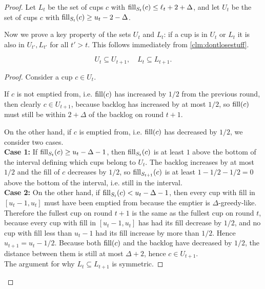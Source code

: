 \begin{proof}
  Let $L_t$ be the set of cups $c$ with $\operatorname{\text{\textup{fill}}}_{S_t}(c) \le \ell_t+2+\Delta$, and let
  $U_t$ be the set of cups $c$ with $\operatorname{\text{\textup{fill}}}_{S_t}(c) \ge u_t-2-\Delta$.

  Now we prove a key property of the sets $U_t$ and $L_t$: if a cup is in
  $U_t$ or $L_t$ it is also in $U_{t'}, L_{t'}$ for all $t' > t$. This
  follows immediately from \cref{clm:dontlosestuff}.
  \begin{clm}
    \label{clm:dontlosestuff}
    $$U_{t} \subseteq U_{t+1},\quad L_t \subseteq L_{t+1}.$$
  \end{clm}
  \begin{proof}
    Consider a cup $c\in U_t$.

    If $c$ is not emptied from, i.e. $\operatorname{\text{\textup{fill}}}(c)$ has increased by
    $1/2$ from the previous round, then
    clearly $c \in U_{t+1}$, because backlog has increased by at most $1/2$, so
    $\operatorname{\text{\textup{fill}}}(c)$ must still be within $2+\Delta$ of the backlog on round $t+1$. 

    On the other hand, if $c$ is emptied from, i.e. $\operatorname{\text{\textup{fill}}}(c)$ has decreased by
    $1/2$, we consider two cases.\\
    \textbf{Case 1:} If $\operatorname{\text{\textup{fill}}}_{S_t}(c) \ge u_t-\Delta -1$, then
    $\operatorname{\text{\textup{fill}}}_{S_t}(c)$ is at least $1$ above the bottom of the
    interval defining which cups belong to $U_t$. The backlog
    increases by at most $1/2$ and the fill of $c$ decreases by $1/2$, so
    $\operatorname{\text{\textup{fill}}}_{S_{t+1}}(c)$ is at least $1-1/2-1/2 = 0$ above the bottom of the
    interval, i.e. still in the interval. \\
    \textbf{Case 2:} On the other hand, if $\operatorname{\text{\textup{fill}}}_{S_t}(c) <
    u_t-\Delta-1$, then every cup with fill in $[u_t-1, u_t]$
    must have been emptied from because the emptier is
    $\Delta$-greedy-like. Therefore the fullest cup
    on round $t+1$ is the same as the fullest cup on round $t$,
    because every cup with fill in $[u_t-1, u_t]$
    has had its fill decrease by $1/2$, and no cup with fill less than
    $u_t-1$ had its fill increase by more than $1/2$. Hence $u_{t+1}
    = u_t -1/2$. Because both $\operatorname{\text{\textup{fill}}}(c)$ and the backlog
    have decreased by $1/2$, the distance between them is
    still at most $\Delta+2$, hence $c\in U_{t+1}$.\\
    The argument for why $L_t \subseteq L_{t+1}$ is symmetric.
  \end{proof}


\end{proof}
